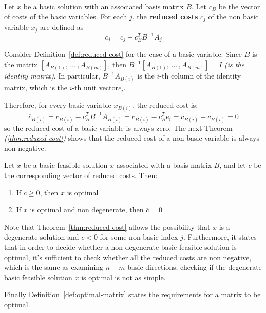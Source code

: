 \documentclass[english]{article}
\begin{document}
\begin{definition}
  Let \(x\) be a basic solution with an associated basis matrix \(B\).
  Let \(c_B\) be the vector of costs of the basic variables.
  For each \(j\), the \textbf{reduced costs} \(\overline{c}_j\) of the non basic variable \(x_j\) are defined as
  \[ \overline{c}_j = c_j - c^T_B B^{-1} A_j \]
  \label{def:reduced-cost}
\end{definition}

\bigskip
Consider Definition~\ref{def:reduced-cost} for the case of a basic variable.
Since \(B\) is the matrix \(\left[ A_{B(1)}, \, \ldots \,, A_{B(m)} \right]\), then \(B^{-1}[A_{B(1)}, \, \ldots \,, A_{B(m)}] = I\) \textit{(is the identity matrix)}.
In particular, \(B^{-1} A_{B(i)}\) is the \(i\)-th column of the identity matrix, which is the \(i\)-th unit vector\(e_i\).

Therefore, for every basic variable \(x_{B(i)}\), the reduced cost is:
\[ \overline{c}_{B(i)} = c_{B(i)} - c^T_B B^{-1} A_{B(i)} = c_{B(i)} - c^T_B e_i = c_{B(i)} -  c_{B(i)} = 0 \]
so the reduced cost of a basic variable is always zero.
The next Theorem \textit{(\ref{thm:reduced-cost})} shows that the reduced cost of a non basic variable is always non negative.

\begin{theorem}
  Let \(x\) be a basic feasible solution \(x\) associated with a basis matrix \(B\), and let \(\overline{c}\) be the corresponding vector of reduced costs.
  Then:

  \begin{enumerate}
    \item If \(\overline{c} \geq 0\), then \(x\) is optimal
    \item If \(x\) is optimal and non degenerate, then \(\overline{c} = 0\)
  \end{enumerate}
  \label{thm:reduced-cost}
\end{theorem}

\bigskip
Note that Theorem~\ref{thm:reduced-cost} allows the possibility that \(x\) is a degenerate solution and \(\overline{c} < 0\) for some non basic index \(j\).
Furthermore, it states that in order to decide whether a non degenerate basic feasible solution is optimal, it's sufficient to check whether all the reduced costs are non negative, which is the same as examining \(n-m\) basic directions;
checking if the degenerate basic feasible solution \(x\) is optimal is not as simple.

Finally Definition~\ref{def:optimal-matrix} states the requirements for a matrix to be optimal.
\end{document}
